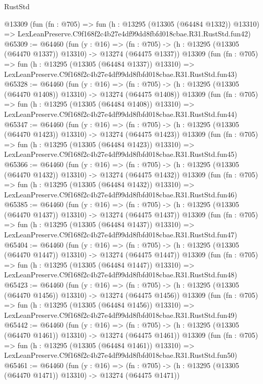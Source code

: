 \begin{lexlean}{RustStd}
\begin{coremodule}
    @13309
    (fun (fn : @705) =>
    fun (h : @13295 (@13305 (@64484 @1332)) @13310) =>
    LexLeanPreserve.C9f168f2c4b27e4df99dd8fbfd018cbae.R31.RustStd.fun42)
@65309 := @64460
    (fun (y : @16) =>
    (fn : @705) -> (h : @13295 (@13305 (@64470 @1337)) @13310) -> @13274 (@64475 @1337))
    @13309
    (fun (fn : @705) =>
    fun (h : @13295 (@13305 (@64484 @1337)) @13310) =>
    LexLeanPreserve.C9f168f2c4b27e4df99dd8fbfd018cbae.R31.RustStd.fun43)
@65328 := @64460
    (fun (y : @16) =>
    (fn : @705) -> (h : @13295 (@13305 (@64470 @1408)) @13310) -> @13274 (@64475 @1408))
    @13309
    (fun (fn : @705) =>
    fun (h : @13295 (@13305 (@64484 @1408)) @13310) =>
    LexLeanPreserve.C9f168f2c4b27e4df99dd8fbfd018cbae.R31.RustStd.fun44)
@65347 := @64460
    (fun (y : @16) =>
    (fn : @705) -> (h : @13295 (@13305 (@64470 @1423)) @13310) -> @13274 (@64475 @1423))
    @13309
    (fun (fn : @705) =>
    fun (h : @13295 (@13305 (@64484 @1423)) @13310) =>
    LexLeanPreserve.C9f168f2c4b27e4df99dd8fbfd018cbae.R31.RustStd.fun45)
@65366 := @64460
    (fun (y : @16) =>
    (fn : @705) -> (h : @13295 (@13305 (@64470 @1432)) @13310) -> @13274 (@64475 @1432))
    @13309
    (fun (fn : @705) =>
    fun (h : @13295 (@13305 (@64484 @1432)) @13310) =>
    LexLeanPreserve.C9f168f2c4b27e4df99dd8fbfd018cbae.R31.RustStd.fun46)
@65385 := @64460
    (fun (y : @16) =>
    (fn : @705) -> (h : @13295 (@13305 (@64470 @1437)) @13310) -> @13274 (@64475 @1437))
    @13309
    (fun (fn : @705) =>
    fun (h : @13295 (@13305 (@64484 @1437)) @13310) =>
    LexLeanPreserve.C9f168f2c4b27e4df99dd8fbfd018cbae.R31.RustStd.fun47)
@65404 := @64460
    (fun (y : @16) =>
    (fn : @705) -> (h : @13295 (@13305 (@64470 @1447)) @13310) -> @13274 (@64475 @1447))
    @13309
    (fun (fn : @705) =>
    fun (h : @13295 (@13305 (@64484 @1447)) @13310) =>
    LexLeanPreserve.C9f168f2c4b27e4df99dd8fbfd018cbae.R31.RustStd.fun48)
@65423 := @64460
    (fun (y : @16) =>
    (fn : @705) -> (h : @13295 (@13305 (@64470 @1456)) @13310) -> @13274 (@64475 @1456))
    @13309
    (fun (fn : @705) =>
    fun (h : @13295 (@13305 (@64484 @1456)) @13310) =>
    LexLeanPreserve.C9f168f2c4b27e4df99dd8fbfd018cbae.R31.RustStd.fun49)
@65442 := @64460
    (fun (y : @16) =>
    (fn : @705) -> (h : @13295 (@13305 (@64470 @1461)) @13310) -> @13274 (@64475 @1461))
    @13309
    (fun (fn : @705) =>
    fun (h : @13295 (@13305 (@64484 @1461)) @13310) =>
    LexLeanPreserve.C9f168f2c4b27e4df99dd8fbfd018cbae.R31.RustStd.fun50)
@65461 := @64460
    (fun (y : @16) =>
    (fn : @705) -> (h : @13295 (@13305 (@64470 @1471)) @13310) -> @13274 (@64475 @1471))

\end{coremodule}
\end{lexlean}
